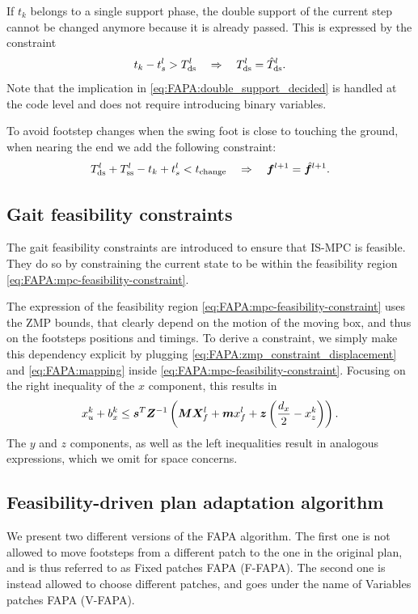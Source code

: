 If $t_k$ belongs to a single support phase, the double support of the current
step cannot be changed anymore because it is already passed. This is expressed
by the constraint
\begin{equation}
	t_k - t_s^l > T^l_{\rm{ds}} \quad \Rightarrow \quad  T^l_{\rm{ds}} = \hat T^l_{\rm{ds}}.
	\label{eq:FAPA:double_support_decided}
\end{equation}
Note that the implication in \eqref{eq:FAPA:double_support_decided} is handled
at the code level and does not require introducing binary variables.

To avoid footstep changes when the swing foot is close to touching the ground,
when nearing the end we add the following constraint:
\begin{equation}
    \label{eq:FAPA:swing_foot_constraint}
	T^l_{\rm ds} + T^l_{\rm ss} - t_k + t_s^l < t_{\mathrm{change}} \quad \Rightarrow \quad
	{\bm{f}}^{l+1} = \hat{{\bm{f}}}^{l+1}.
\end{equation}

\subsection{Gait feasibility constraints}
The gait feasibility constraints are introduced to ensure that IS-MPC is
feasible. They do so by constraining the current state to be within the
feasibility region \eqref{eq:FAPA:mpc-feasibility-constraint}.

The expression of the feasibility region
\eqref{eq:FAPA:mpc-feasibility-constraint} uses the ZMP bounds, that clearly
depend on the motion of the moving box, and thus on the footsteps positions
and timings. To derive a constraint, we simply make this dependency explicit
by plugging \eqref{eq:FAPA:zmp_constraint_displacement} and
\eqref{eq:FAPA:mapping} inside \eqref{eq:FAPA:mpc-feasibility-constraint}.
Focusing on the right inequality of the $x$ component, this results in
\begin{equation}
    \label{eq:FAPA:gait_feasibility_constraint}
    x_u^k + b_x^k \le \bm{s}^T \bm{Z}^{-1} \left({\bm{M}}{\bm{X}}_f^l + {\bm{m}} x_f^l + \bm{z} \left(\frac{d_x}{2} - x_z^k\right)\right).
\end{equation}
The $y$ and $z$ components, as well as the left inequalities result in
analogous expressions, which we omit for space concerns.

\subsection{Feasibility-driven plan adaptation algorithm}
We present two different versions of the FAPA algorithm. The first one is not
allowed to move footsteps from a different patch to the one in the original
plan, and is thus referred to as Fixed patches FAPA (F-FAPA). The second one
is instead allowed to choose different patches, and goes under the name of
Variables patches FAPA (V-FAPA).


